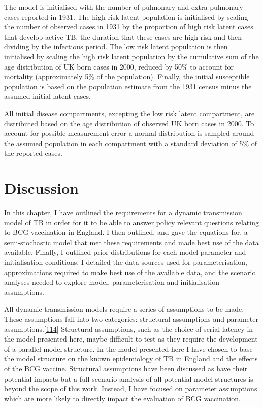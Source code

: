 \documentclass[11pt,twoside]{bristolthesis}
\begin{document}
  The model is initialised with the number of pulmonary and extra-pulmonary cases reported in 1931. The high risk latent population is initialised by scaling the number of observed cases in 1931 by the proportion of high risk latent cases that develop active TB, the duration that these cases are high risk and then dividing by the infectious period. The low risk latent population is then initialised by scaling the high risk latent population by the cumulative sum of the age distribution of UK born cases in 2000, reduced by 50\% to account for mortality (approximately 5\% of the population). Finally, the initial susceptible population is based on the population estimate from the 1931 census minus the assumed initial latent cases.
  
  All initial disease compartments, excepting the low risk latent compartment, are distributed based on the age distribution of observed UK born cases in 2000. To account for possible measurement error a normal distribution is sampled around the assumed population in each compartment with a standard deviation of 5\% of the reported cases.
  
  \hypertarget{discussion-5}{%
  \section{Discussion}\label{discussion-5}}
  
  In this chapter, I have outlined the requirements for a dynamic transmission model of TB in order for it to be able to answer policy relevant questions relating to BCG vaccination in England. I then outlined, and gave the equations for, a semi-stochastic model that met these requirements and made best use of the data available. Finally, I outlined prior distributions for each model parameter and initialisation conditions. I detailed the data sources used for parameterisation, approximations required to make best use of the available data, and the scenario analyses needed to explore model, parameterisation and initialisation assumptions.
  
  All dynamic transmission models require a series of assumptions to be made. These assumptions fall into two categories: structural assumptions and parameter assumptions.{[}\protect\hyperlink{ref-Dowdy2012}{114}{]} Structural assumptions, such as the choice of serial latency in the model presented here, maybe difficult to test as they require the development of a parallel model structure. In the model presented here I have chosen to base the model structure on the known epidemiology of TB in England and the effects of the BCG vaccine. Structural assumptions have been discussed as have their potential impacts but a full scenario analysis of all potential model structures is beyond the scope of this work. Instead, I have focused on parameter assumptions which are more likely to directly impact the evaluation of BCG vaccination.
  
\end{document}
